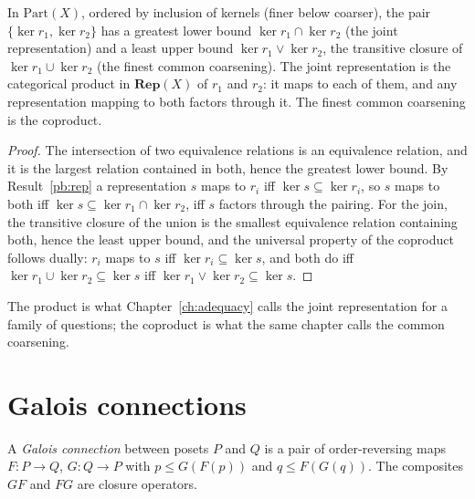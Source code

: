 \begin{newresult}\label{pb:meet-join}
In $\mathrm{Part}(X)$, ordered by inclusion of kernels (finer below coarser), the pair $\{\ker r_1,\ker r_2\}$ has a greatest lower bound $\ker r_1\cap\ker r_2$ (the joint representation) and a least upper bound $\ker r_1\vee\ker r_2$, the transitive closure of $\ker r_1\cup\ker r_2$ (the finest common coarsening). The joint representation is the categorical product in $\mathbf{Rep}(X)$ of $r_1$ and $r_2$: it maps to each of them, and any representation mapping to both factors through it. The finest common coarsening is the coproduct.
\end{newresult}
\begin{proof}
The intersection of two equivalence relations is an equivalence relation, and it is the largest relation contained in both, hence the greatest lower bound. By Result~\ref{pb:rep} a representation $s$ maps to $r_i$ iff $\ker s\subseteq\ker r_i$, so $s$ maps to both iff $\ker s\subseteq\ker r_1\cap\ker r_2$, iff $s$ factors through the pairing. For the join, the transitive closure of the union is the smallest equivalence relation containing both, hence the least upper bound, and the universal property of the coproduct follows dually: $r_i$ maps to $s$ iff $\ker r_i\subseteq\ker s$, and both do iff $\ker r_1\cup\ker r_2\subseteq\ker s$ iff $\ker r_1\vee\ker r_2\subseteq\ker s$.
\end{proof}

The product is what Chapter~\ref{ch:adequacy} calls the joint representation for a family of questions; the coproduct is what the same chapter calls the common coarsening.

\section{Galois connections}

A \emph{Galois connection} between posets $P$ and $Q$ is a pair of order-reversing maps $F:P\to Q$, $G:Q\to P$ with $p\le G(F(p))$ and $q\le F(G(q))$. The composites $GF$ and $FG$ are closure operators.

